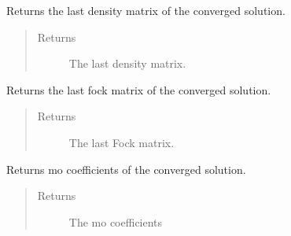 \documentclass[letterpaper,10pt,english]{sphinxmanual}
\begin{document}
\begin{fulllineitems}
\begin{fulllineitems}
\label{\detokenize{RHF:ghf.RHF.RHF.get_last_dens}}
Returns the last density matrix of the converged solution.
\begin{quote}\begin{description}
\item[{Returns}] \leavevmode
The last density matrix.

\end{description}\end{quote}

\end{fulllineitems}


\begin{fulllineitems}
\label{\detokenize{RHF:ghf.RHF.RHF.get_last_fock}}
Returns the last fock matrix of the converged solution.
\begin{quote}\begin{description}
\item[{Returns}] \leavevmode
The last Fock matrix.

\end{description}\end{quote}

\end{fulllineitems}


\begin{fulllineitems}
\label{\detokenize{RHF:ghf.RHF.RHF.get_mo_coeff}}
Returns mo coefficients of the converged solution.
\begin{quote}\begin{description}
\item[{Returns}] \leavevmode
The mo coefficients

\end{description}\end{quote}

\end{fulllineitems}



\end{fulllineitems}
\end{document}
